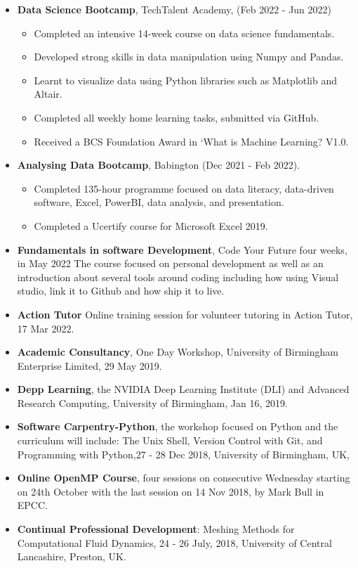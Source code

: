 \documentclass[line]{res}
\newenvironment{p1}
{\begin{adjustwidth}{-30pt}{0pt}
\vspace{8pt}}
{\end{adjustwidth}}
\begin{document}
\begin{resume}
\begin{p1}
\begin{itemize}
	\item \textbf{Data Science Bootcamp}, TechTalent Academy, (Feb 2022 - Jun 2022)
	\begin{itemize}
		\item Completed an intensive 14-week course on data science fundamentals.
		\item Developed strong skills in data manipulation using Numpy and Pandas.
		\item Learnt to visualize data using Python libraries such as Matplotlib and Altair.
		\item Completed all weekly home learning tasks, submitted via GitHub.
		\item Received a BCS Foundation Award in ‘What is Machine Learning? V1.0.
	\end{itemize}
	\item \textbf{Analysing Data Bootcamp}, Babington (Dec 2021 - Feb 2022).
	\begin{itemize}
		\item Completed 135-hour programme focused on data literacy, data-driven software, Excel, PowerBI, data analysis, and presentation.
		\item Completed a Ucertify course for Microsoft Excel 2019.
	\end{itemize}
	\item \textbf{Fundamentals in software Development}, Code Your Future four weeks, in May 2022
	The course focused on personal development as well as an introduction about several tools around coding including how using Visual studio, link it to Github and how ship it to live.  
	\item \textbf{Action Tutor} Online training session for volunteer tutoring in Action Tutor, 17 Mar 2022.
	\item \textbf{Academic Consultancy}, One Day Workshop, University of Birmingham Enterprise Limited, 29 May 2019.
	\item \textbf{Depp Learning}, the NVIDIA Deep Learning Institute (DLI) and Advanced Research Computing, University of Birmingham, Jan 16, 2019. 
	\item \textbf{Software Carpentry-Python}, the workshop focused on Python and the curriculum will include: The Unix Shell, Version Control with Git, and Programming with Python,27 - 28 Dec 2018, University of Birmingham, UK,  
	\item 	\textbf{Online OpenMP Course},  four sessions on consecutive Wednesday starting on 24th October with the last session on 14 Nov 2018, by Mark Bull in EPCC.
	\item \textbf{Continual Professional Development}: Meshing Methods for Computational Fluid Dynamics, 24 - 26 July, 2018, University of Central Lancashire, Preston, UK. 
\end{itemize}
\end{p1}



\end{resume}
\end{document}
